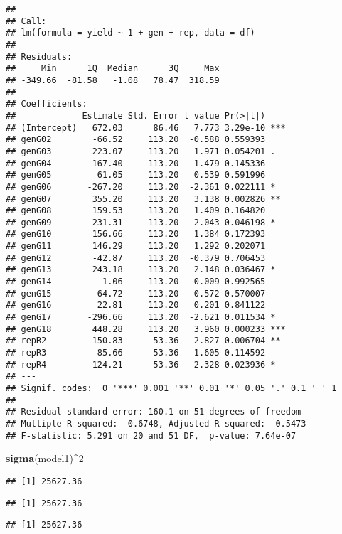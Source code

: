 \documentclass[
]{article}
\newenvironment{Shaded}{\begin{snugshade}}{\end{snugshade}}
\newcommand{\DecValTok}[1]{\textcolor[rgb]{0.00,0.00,0.81}{#1}}
\newcommand{\FunctionTok}[1]{\textcolor[rgb]{0.13,0.29,0.53}{\textbf{#1}}}
\newcommand{\NormalTok}[1]{#1}
\newcommand{\SpecialCharTok}[1]{\textcolor[rgb]{0.81,0.36,0.00}{\textbf{#1}}}
\begin{document}
\begin{verbatim}
## 
## Call:
## lm(formula = yield ~ 1 + gen + rep, data = df)
## 
## Residuals:
##     Min      1Q  Median      3Q     Max 
## -349.66  -81.58   -1.08   78.47  318.59 
## 
## Coefficients:
##             Estimate Std. Error t value Pr(>|t|)    
## (Intercept)   672.03      86.46   7.773 3.29e-10 ***
## genG02        -66.52     113.20  -0.588 0.559393    
## genG03        223.07     113.20   1.971 0.054201 .  
## genG04        167.40     113.20   1.479 0.145336    
## genG05         61.05     113.20   0.539 0.591996    
## genG06       -267.20     113.20  -2.361 0.022111 *  
## genG07        355.20     113.20   3.138 0.002826 ** 
## genG08        159.53     113.20   1.409 0.164820    
## genG09        231.31     113.20   2.043 0.046198 *  
## genG10        156.66     113.20   1.384 0.172393    
## genG11        146.29     113.20   1.292 0.202071    
## genG12        -42.87     113.20  -0.379 0.706453    
## genG13        243.18     113.20   2.148 0.036467 *  
## genG14          1.06     113.20   0.009 0.992565    
## genG15         64.72     113.20   0.572 0.570007    
## genG16         22.81     113.20   0.201 0.841122    
## genG17       -296.66     113.20  -2.621 0.011534 *  
## genG18        448.28     113.20   3.960 0.000233 ***
## repR2        -150.83      53.36  -2.827 0.006704 ** 
## repR3         -85.66      53.36  -1.605 0.114592    
## repR4        -124.21      53.36  -2.328 0.023936 *  
## ---
## Signif. codes:  0 '***' 0.001 '**' 0.01 '*' 0.05 '.' 0.1 ' ' 1
## 
## Residual standard error: 160.1 on 51 degrees of freedom
## Multiple R-squared:  0.6748, Adjusted R-squared:  0.5473 
## F-statistic: 5.291 on 20 and 51 DF,  p-value: 7.64e-07
\end{verbatim}

\begin{Shaded}
\begin{Highlighting}[]
\FunctionTok{sigma}\NormalTok{(model1)}\SpecialCharTok{\^{}}\DecValTok{2}
\end{Highlighting}
\end{Shaded}

\begin{verbatim}
## [1] 25627.36
\end{verbatim}

\begin{Shaded}
\end{Shaded}

\begin{verbatim}
## [1] 25627.36
\end{verbatim}

\begin{Shaded}
\end{Shaded}

\begin{verbatim}
## [1] 25627.36
\end{verbatim}
\end{document}
